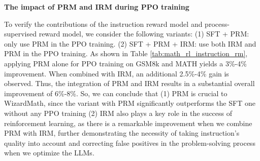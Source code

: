 \textbf{The impact of PRM and IRM during PPO training}

To verify the contributions of the instruction reward model and process-supervised reward model, we consider the following variants: (1) SFT + PRM: only use PRM in the PPO training. (2) SFT + PRM + IRM: use both IRM and PRM in the PPO training.  As shown in Table \ref{tab:math_rl_instruction_rm}, applying PRM alone for PPO training on GSM8k and MATH yields a 3\%-4\% improvement. When combined with IRM, an additional 2.5\%-4\% gain is observed. Thus, the integration of PRM and IRM results in a substantial overall improvement of 6\%-8\%. So, we can conclude that (1) PRM is crucial to WizardMath, since the variant with PRM significantly outperforms the SFT one without any PPO training (2) IRM also plays a key role in the success of reinforcement learning, as there is a remarkable improvement when we combine PRM with IRM, further demonstrating the necessity of taking instruction's quality into account and correcting false positives in the problem-solving process when we optimize the LLMs.

